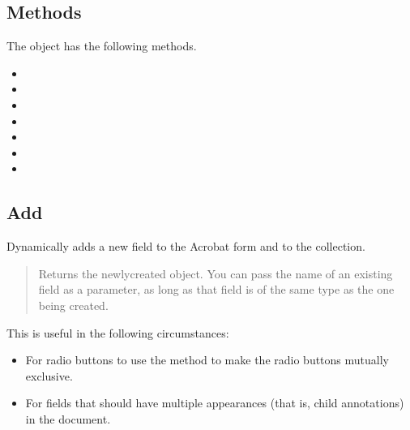 \documentclass[letterpaper,12pt,english,openany,oneside]{sphinxmanual}
\begin{document}
\subsection{Methods}
\label{\detokenize{IAC_API_FormsIntro:methods-1}}\label{\detokenize{IAC_API_FormsIntro:id1}}
The  object has the following methods.
\begin{itemize}
\item {} 

\item {} 

\item {} 

\item {} 

\item {} 

\item {} 

\item {} 

\end{itemize}




\subsection{Add}
\label{\detokenize{IAC_API_FormsIntro:add}}
Dynamically adds a new field to the Acrobat form and to the  collection.
\begin{quote}

Returns  the newly\sphinxhyphen{}created  object. You can pass the name of an existing field as a parameter, as long as that field is of the same type as the one being created.
\end{quote}

This is useful in the following circumstances:
\begin{itemize}
\item {} 
For radio buttons to use the  method to make the radio buttons mutually exclusive.

\item {} 
For fields that should have multiple appearances (that is, child annotations) in the document.

\end{itemize}
\label{\detokenize{IAC_API_FormsIntro:syntax-33}}
\end{document}
